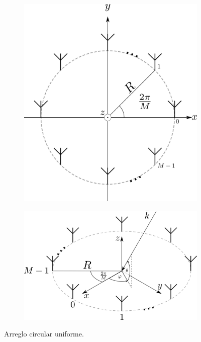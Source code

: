 \begin{figure}[ht!]
    \centering
    \begin{subfigure}[b]{0.7\textwidth}
        \centering
        \includegraphics[width=\linewidth]{images/02-Beamforming/uca.png}
    \end{subfigure}
    \hfill
    \begin{subfigure}[b]{0.7\textwidth}
        \centering
        \includegraphics[width=\linewidth]{images/02-Beamforming/uca_3d.png}
    \end{subfigure}
    \caption{Arreglo circular uniforme.}
    \label{fig:beamforming_uca}
\end{figure}


